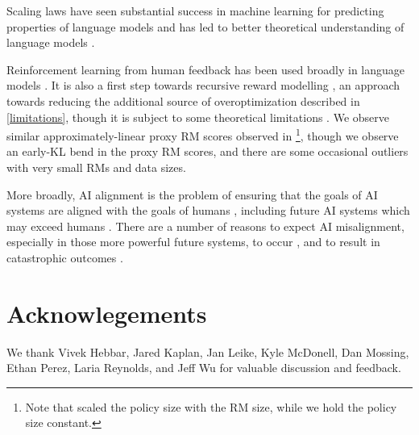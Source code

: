 \documentclass{article}
\theoremstyle{plain}
\begin{document}
Scaling laws have seen substantial success in machine learning for predicting properties of language models \citep{kaplan2020scaling,henighan2020scaling,hernandez2021scaling} and has led to better theoretical understanding of language models \citep{sharma2020neural,bahri2021explaining}.

%

Reinforcement learning from human feedback \citep{christiano2017deep,ibarz2018reward} has been used broadly in language models \citep{summarization,instructgpt,webgpt,anthropicrlhf1}. It is also a first step towards recursive reward modelling \citep{leike2018scalable}, an approach towards reducing the additional source of overoptimization described in \cref{limitations}, though it is subject to some theoretical limitations \citep{elk}. We observe similar approximately-linear proxy RM scores observed in \citet{anthropicrlhf1}\footnote{Note that \citet{anthropicrlhf1} scaled the policy size with the RM size, while we hold the policy size constant.}, though we observe an early-KL bend in the proxy RM scores, and there are some occasional outliers with very small RMs and data sizes.




%



More broadly, AI alignment is the problem of ensuring that the goals of AI systems are aligned with the goals of humans \citep{ngo2022alignment}, including future AI systems which may exceed humans \citep{bostrom2014superintelligence}. There are a number of reasons to expect AI misalignment, especially in those more powerful future systems, to occur \citep{Omohundro2008TheBA,turner2021optimal,armstrong2013general,hubinger2019rlo,soares2015corrigibility}, and to result in catastrophic outcomes \citep{carlsmith2022power,ajeya-rlhf}.


\section*{Acknowlegements}

We thank Vivek Hebbar, Jared Kaplan, Jan Leike, Kyle McDonell, Dan Mossing, Ethan Perez, Laria Reynolds, and Jeff Wu for valuable discussion and feedback.


 
\newpage
\appendix
\end{document}
